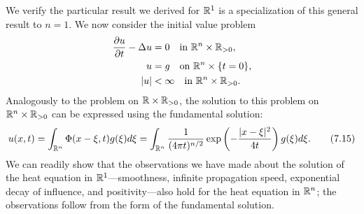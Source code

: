 We verify the particular result we derived for $\mathbb{R}^1$ is a specialization of this general result to $n = 1$. We now consider the initial value problem
\begin{align*}
    \frac{\partial u}{\partial t} - \Delta u &= 0 \quad \text{in } \mathbb{R}^n \times \mathbb{R}_{>0}, \\
    u &= g \quad \text{on } \mathbb{R}^n \times \{t = 0\}, \\
    |u| &< \infty \quad \text{in } \mathbb{R}^n \times \mathbb{R}_{>0}.
\end{align*}
Analogously to the problem on $\mathbb{R} \times \mathbb{R}_{>0}$, the solution to this problem on $\mathbb{R}^n \times \mathbb{R}_{>0}$ can be expressed using the fundamental solution:
\begin{equation*}
    u(x, t) = \int_{\mathbb{R}^n} \Phi(x - \xi, t) g(\xi) d\xi = \int_{\mathbb{R}^n} \frac{1}{(4\pi t)^{n/2}} \exp\left(-\frac{|x - \xi|^2}{4t}\right) g(\xi) d\xi. \tag{7.15}
\end{equation*}
We can readily show that the observations we have made about the solution of the heat equation in $\mathbb{R}^1$---smoothness, infinite propagation speed, exponential decay of influence, and positivity---also hold for the heat equation in $\mathbb{R}^n$; the observations follow from the form of the fundamental solution.
